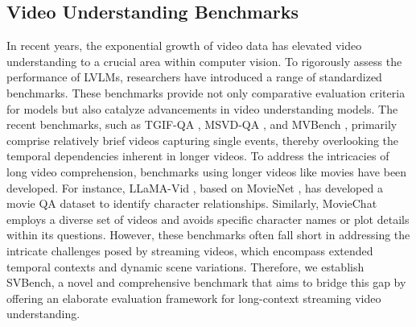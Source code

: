 \subsection{Video Understanding Benchmarks}
In recent years, the exponential growth of video data has elevated video understanding to a crucial area within computer vision.
%
To rigorously assess the performance of LVLMs, researchers have introduced a range of standardized benchmarks. 
%
These benchmarks provide not only comparative evaluation criteria for models but also catalyze advancements in video understanding models. 
%
The recent benchmarks, such as TGIF-QA \cite{jang2017tgif}, MSVD-QA \cite{xu2017video}, and MVBench \cite{li2024mvbench}, primarily comprise relatively brief videos capturing single events, thereby overlooking the temporal dependencies inherent in longer videos. 
%
To address the intricacies of long video comprehension, benchmarks using longer videos like movies have been developed. 
%
For instance, LLaMA-Vid \cite{li2023llama}, based on MovieNet \cite{huang2020movienet}, has developed a movie QA dataset to identify character relationships.
%
Similarly, MovieChat \cite{su2020moviechats} employs a diverse set of videos and avoids specific character names or plot details within its questions.
%
However, these benchmarks often fall short in addressing the intricate challenges posed by streaming videos, which encompass extended temporal contexts and dynamic scene variations. 
%
Therefore, we establish SVBench, a novel and comprehensive benchmark that aims to bridge this gap by offering an elaborate evaluation framework for long-context streaming video understanding.
%
